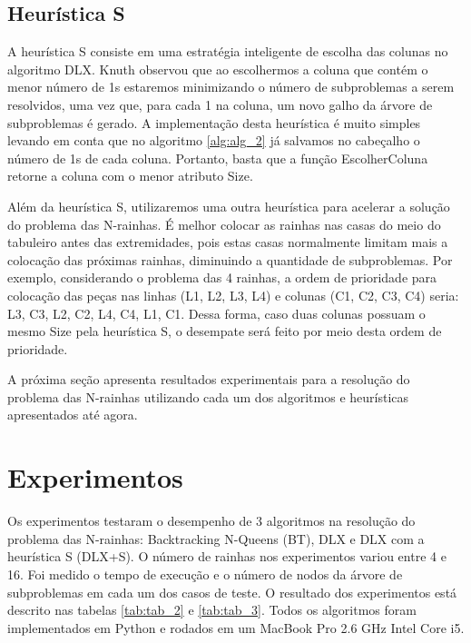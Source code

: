 \documentclass{article}
\begin{document}
\subsection{Heurística S}

A heurística S consiste em uma estratégia inteligente de escolha das colunas no algoritmo DLX. Knuth
observou que ao escolhermos a coluna que contém o menor número de 1s estaremos minimizando o
número de subproblemas a serem resolvidos, uma vez que, para cada 1 na coluna, um novo galho da árvore de subproblemas é gerado.
A implementação desta heurística é muito simples levando em conta que no algoritmo \ref{alg:alg_2} já salvamos no 
cabeçalho o número de 1s de cada coluna. Portanto, basta que a função EscolherColuna retorne a coluna com o menor
atributo Size.

Além da heurística S, utilizaremos uma outra heurística para acelerar a solução do problema das N-rainhas.
É melhor colocar as rainhas nas casas do meio do tabuleiro antes das extremidades, pois estas casas
normalmente limitam mais a colocação das próximas rainhas, diminuindo a quantidade de subproblemas.
Por exemplo, considerando o problema das 4 rainhas, a ordem de prioridade para colocação das peças nas 
linhas (L1, L2, L3, L4) e colunas (C1, C2, C3, C4) seria: L3, C3, L2, C2, L4, C4, L1, C1. Dessa forma,
caso duas colunas possuam o mesmo Size pela heurística S, o desempate será feito por meio desta ordem de prioridade.

A próxima seção apresenta resultados experimentais para a resolução do problema das N-rainhas utilizando cada um dos algoritmos
e heurísticas apresentados até agora.

\section{Experimentos}

Os experimentos testaram o desempenho de 3 algoritmos na resolução do problema das N-rainhas: Backtracking N-Queens (BT),
DLX e DLX com a heurística S (DLX+S). O número de rainhas nos experimentos variou entre 4 e 16. Foi medido o tempo de execução
e o número de nodos da árvore de subproblemas em cada um dos casos de teste. O resultado dos experimentos está descrito nas tabelas
\ref{tab:tab_2} e \ref{tab:tab_3}. Todos os algoritmos foram implementados em Python e rodados em um MacBook Pro 2.6 GHz Intel Core i5.
\end{document}
